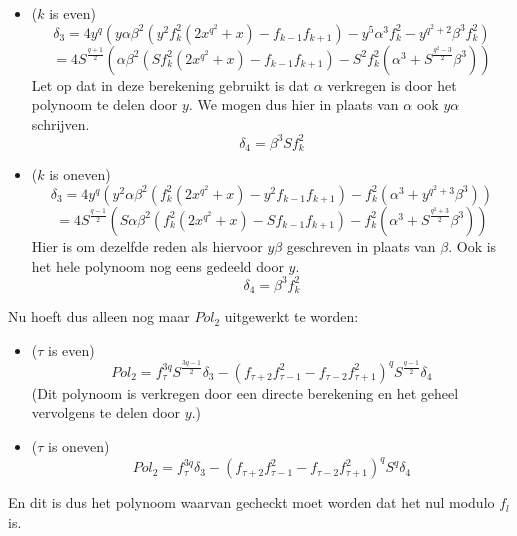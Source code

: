 \documentclass[10pt]{article}
\begin{document}
\begin{enumerate}
\begin{itemize}
\item ($k$ is even) $$\delta_3=4y^q(y\alpha\beta^2(y^2f_k^2(2x^{q^2}+x)-f_{k-1}f_{k+1})-y^5\alpha^3f_k^2-y^{q^2+2}\beta^3f_k^2)$$
$$=4S^\frac{q+1}{2}(\alpha\beta^2(Sf_k^2(2x^{q^2}+x)-f_{k-1}f_{k+1})-S^2f_k^2(\alpha^3+S^\frac{q^2-3}{2}\beta^3))$$
Let op dat in deze berekening gebruikt is dat $\alpha$ verkregen is door het polynoom te delen door $y$. We mogen dus hier in plaats van $\alpha$ ook $y\alpha$ schrijven.
$$\delta_4=\beta^3Sf_k^2$$
\item ($k$ is oneven) $$\delta_3=4y^q(y^2\alpha\beta^2(f_k^2(2x^{q^2}+x)-y^2f_{k-1}f_{k+1})-f_k^2(\alpha^3+y^{q^2+3}\beta^3))$$
$$=4S^\frac{q-1}{2}(S\alpha\beta^2(f_k^2(2x^{q^2}+x)-Sf_{k-1}f_{k+1})-f_k^2(\alpha^3+S^\frac{q^2+3}{2}\beta^3))$$
Hier is om dezelfde reden als hiervoor $y\beta$ geschreven in plaats van $\beta$. Ook is het hele polynoom nog eens gedeeld door $y$.
$$\delta_4=\beta^3f_k^2$$
\end{itemize}

Nu hoeft dus alleen nog maar $Pol_2$ uitgewerkt te worden:
\begin{itemize}
\item ($\tau$ is even) $$Pol_2=f_\tau^{3q}S^\frac{3q-1}{2}\delta_3-(f_{\tau+2}f_{\tau-1}^2-f_{\tau-2}f_{\tau+1}^2)^qS^\frac{q-1}{2}\delta_4$$
(Dit polynoom is verkregen door een directe berekening en het geheel vervolgens te delen door $y$.)
\item ($\tau$ is oneven) $$Pol_2=f_\tau^{3q}\delta_3-(f_{\tau+2}f_{\tau-1}^2-f_{\tau-2}f_{\tau+1}^2)^qS^q\delta_4$$
\end{itemize}
En dit is dus het polynoom waarvan gecheckt moet worden dat het nul modulo $f_l$ is.
\end{enumerate}
\end{document}
